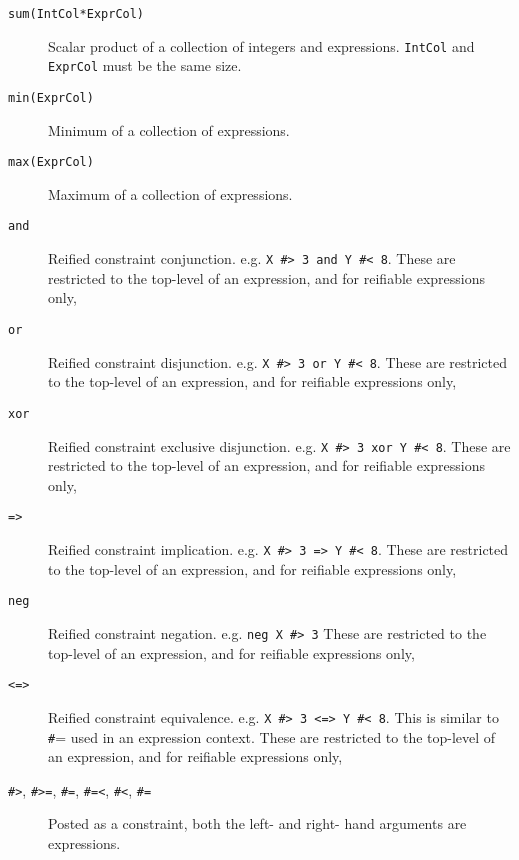 \begin{description}
\item[\texttt{sum(IntCol*ExprCol)}]
	    Scalar product of a collection of integers and expressions.
            \verb'IntCol' and \verb'ExprCol' must be the same size.

\item[\texttt{min(ExprCol)}]
	    Minimum of a collection of expressions.

\item[\texttt{max(ExprCol)}]
	    Maximum of a collection of expressions.

\item[\texttt{and}]
	    Reified constraint conjunction.  e.g. \verb'X #> 3 and Y #< 8'.
            These are restricted to the top-level of an expression,
            and for reifiable expressions only,

\item[\texttt{or}]
	    Reified constraint disjunction.  e.g. \verb'X #> 3 or Y #< 8'.
            These are restricted to the top-level of an expression,
            and for reifiable expressions only,

\item[\texttt{xor}]
	    Reified constraint exclusive disjunction.  e.g. \verb'X #> 3 xor Y #< 8'.
            These are restricted to the top-level of an expression,
            and for reifiable expressions only,

\item[\texttt{=>}]
	    Reified constraint implication.  e.g. \verb'X #> 3 => Y #< 8'.
            These are restricted to the top-level of an expression,
            and for reifiable expressions only,

\item[\texttt{neg}]
	    Reified constraint negation.  e.g. \verb'neg X #> 3'
            These are restricted to the top-level of an expression,
            and for reifiable expressions only,

\item[\texttt{<=>}]
	    Reified constraint equivalence.  e.g. \verb'X #> 3 <=> Y #< 8'.
            This is similar to {\texttt \#=} used in an expression context.
            These are restricted to the top-level of an expression,
            and for reifiable expressions only,

\item[
    \texttt{\#>}, \texttt{\#>=}, \texttt{\#=}, \texttt{\#=<},
 \texttt{\#<},
    \texttt{\#\bsl=}]

    Posted as a constraint, both the left- and right- hand arguments are
    expressions.


\end{description}
